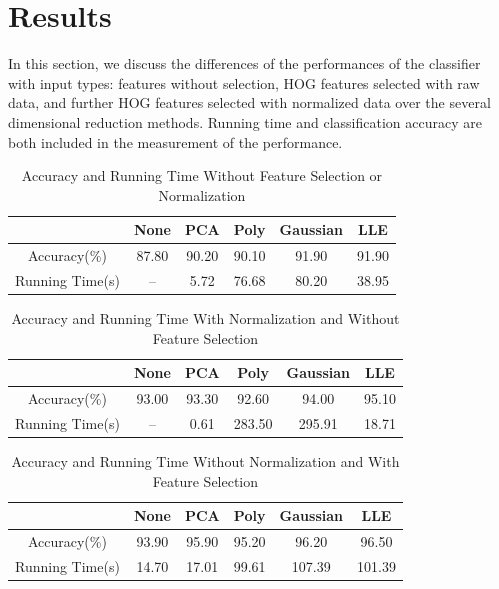 \documentclass[12pt]{article}
\begin{document}
\section{Results}
In this section, we discuss the differences of the performances of the classifier with input types: features without selection, HOG features selected with raw data, and further HOG features selected with normalized data over the several dimensional reduction methods. Running time and classification accuracy are both included in the measurement of the performance.
\begin{table}[h!]
\centering
\caption{Accuracy and Running Time Without Feature Selection or Normalization}
\label{tab:res}
\begin{tabular}{cccccc}
\hline
& \textbf{None} & \textbf{PCA} & \textbf{Poly} & \textbf{Gaussian} & \textbf{LLE} \\
 \hline
Accuracy(\%)               &   87.80     &   90.20 &90.10 &91.90 &91.90  \\
\hline
Running Time(s)    & --            &  5.72    &    76.68 & 80.20 &38.95\\
\hline
\end{tabular}
\end{table}
\begin{table}[h!]
\centering
\caption{Accuracy and Running Time With Normalization and Without Feature Selection}
\label{tab:res}
\begin{tabular}{cccccc}
\hline
& \textbf{None} & \textbf{PCA} & \textbf{Poly} & \textbf{Gaussian} & \textbf{LLE} \\
 \hline
Accuracy(\%)               &   93.00    &   93.30 &92.60 &94.00 &95.10  \\
\hline
Running Time(s)    & --            &  0.61    &    283.50 & 295.91 &18.71\\
\hline
\end{tabular}
\end{table}
\begin{table}[h!]
\centering
\caption{Accuracy and Running Time Without Normalization and With Feature Selection}
\label{tab:res}
\begin{tabular}{cccccc}
\hline
& \textbf{None} & \textbf{PCA} & \textbf{Poly} & \textbf{Gaussian} & \textbf{LLE} \\
 \hline
Accuracy(\%)               &   93.90     &   95.90 &95.20 &96.20 &96.50  \\
\hline
Running Time(s)    & 14.70       &  17.01    & 99.61 &107.39   & 101.39\\
\hline
\end{tabular}
\end{table}
\end{document}
